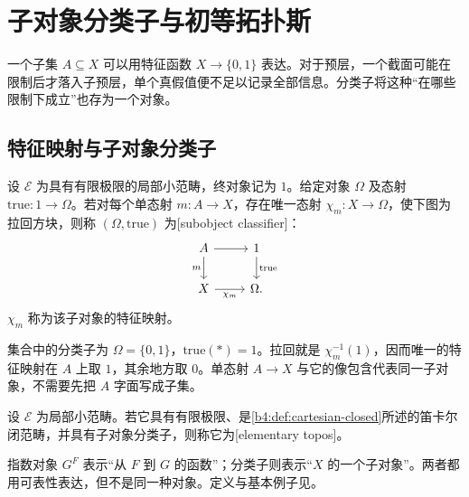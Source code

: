 
\section{子对象分类子与初等拓扑斯}
\label{b4:sec:E02}

一个子集 \(A\subseteq X\) 可以用特征函数 \(X\to\{0,1\}\) 表达。对于预层，一个截面可能在限制后才落入子预层，单个真假值便不足以记录全部信息。分类子将这种“在哪些限制下成立”也存为一个对象。

\subsection{特征映射与子对象分类子}
\label{b4:subsec:E02:01}

\begin{definition}\label{b4:def:subobject-classifier}
	设 \(\mathcal E\) 为具有有限极限的局部小范畴，终对象记为 \(1\)。给定对象 \(\Omega\) 及态射 \(\mathrm{true}:1\to\Omega\)。若对每个单态射 \(m:A\to X\)，存在唯一态射 \(\chi_m:X\to\Omega\)，使下图为拉回方块，则称 \((\Omega,\mathrm{true})\) 为[subobject classifier]：
	\[
		\begin{tikzcd}
			A\arrow[r]\arrow[d,"m"']&1\arrow[d,"\mathrm{true}"]\\
			X\arrow[r,"\chi_m"']&\Omega.
		\end{tikzcd}
	\]
	\(\chi_m\) 称为该子对象的特征映射。
\end{definition}

集合中的分类子为 \(\Omega=\{0,1\}\)，\(\mathrm{true}(*)=1\)。拉回就是 \(\chi_m^{-1}(1)\)，因而唯一的特征映射在 \(A\) 上取 \(1\)，其余地方取 \(0\)。单态射 \(A\to X\) 与它的像包含代表同一子对象，不需要先把 \(A\) 字面写成子集。

\begin{definition}\label{b4:def:elementary-topos}
	设 \(\mathcal E\) 为局部小范畴。若它具有有限极限、是\cref{b4:def:cartesian-closed}所述的笛卡尔闭范畴，并具有子对象分类子，则称它为[elementary topos]。
\end{definition}

指数对象 \(G^F\) 表示“从 \(F\) 到 \(G\) 的函数”；分类子则表示“\(X\) 的一个子对象”。两者都用可表性表达，但不是同一种对象。定义与基本例子见\cite[Chapter IV, Section 1]{MacLaneMoerdijk1992Sheaves}。

